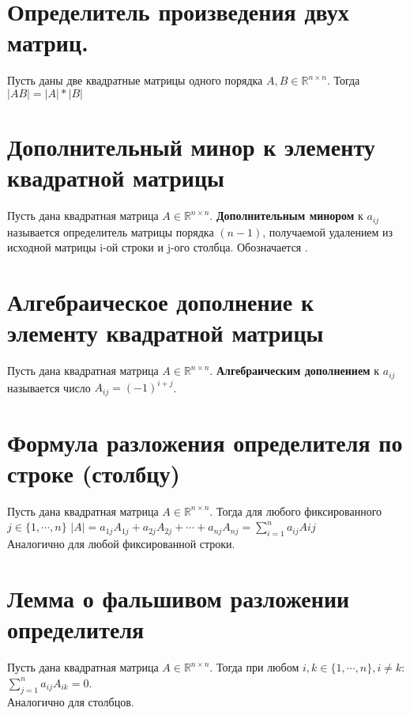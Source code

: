 \documentclass[a4paper,11pt]{report}
\begin{document}
\section{Определитель произведения двух матриц.}
Пусть даны две квадратные матрицы одного порядка $A, B \in \mathbb{R}^{n\times{n}}$. Тогда
$|AB| = |A| * |B|$
\section{Дополнительный минор к элементу квадратной матрицы}
Пусть дана квадратная матрица $A \in \mathbb{R}^{n\times{n}}$. \textbf{Дополнительным минором} к $a_{ij}$ называется
определитель матрицы порядка $(n - 1)$, получаемой удалением из исходной матрицы i-ой строки и j-ого столбца.
Обозначается .
\section{Алгебраическое дополнение к элементу квадратной матрицы}
Пусть дана квадратная матрица $A \in \mathbb{R}^{n\times{n}}$. \textbf{Алгебраическим дополнением} к $a_{ij}$ называется
число $A_{ij} = (-1)^{i + j}$.
\section{Формула разложения определителя по строке (столбцу)}
Пусть дана квадратная матрица $A \in \mathbb{R}^{n\times{n}}$. Тогда для любого фиксированного $j \in \{1, \cdots, n\}$
$|A| = a_{1j}A_{1j} + a_{2j}A_{2j} + \cdots + a_{nj}A_{nj} = \sum\limits_{i = 1}^n{a_{ij}A{ij}}$\\
Аналогично для любой фиксированной строки.
\section{Лемма о фальшивом разложении определителя}
Пусть дана квадратная матрица $A \in \mathbb{R}^{n\times{n}}$. Тогда при любом $i, k \in \{1, \cdots, n\}, i \neq k$:
$\sum\limits_{j = 1}^n{a_{ij}A_{ik}} = 0$.\\
Аналогично для столбцов.
\end{document}
